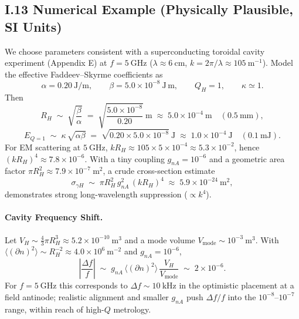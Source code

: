 \subsection*{I.13 Numerical Example (Physically Plausible, SI Units)}
We choose parameters consistent with a superconducting toroidal cavity experiment (Appendix E) at $f\!=\!5~\mathrm{GHz}$ ($\lambda\!\approx\!6~\mathrm{cm}$, $k\!=\!2\pi/\lambda\!\approx\!105~\mathrm{m^{-1}}$). 
Model the effective Faddeev--Skyrme coefficients as
\begin{equation}
\alpha = 0.20~\mathrm{J/m},\qquad \beta = 5.0\times 10^{-8}~\mathrm{J\,m},\qquad Q_H=1,\qquad \kappa\simeq 1.
\end{equation}
Then
\begin{equation}
R_H \;\sim\; \sqrt{\frac{\beta}{\alpha}} \;=\; \sqrt{\frac{5.0\times 10^{-8}}{0.20}}~\mathrm{m} \;\approx\; 5.0\times 10^{-4}~\mathrm{m}\quad (0.5~\mathrm{mm}),
\end{equation}
\begin{equation}
E_{Q=1} \;\sim\; \kappa\,\sqrt{\alpha\beta} \;=\; \sqrt{0.20\times 5.0\times 10^{-8}}~\mathrm{J} \;\approx\; 1.0\times 10^{-4}~\mathrm{J}\quad (0.1~\mathrm{mJ}).
\end{equation}
For EM scattering at $5~\mathrm{GHz}$, $kR_H \approx 105 \times 5\times 10^{-4} \approx 5.3\times 10^{-2}$, hence $(kR_H)^4 \approx 7.8\times 10^{-6}$. 
With a tiny coupling $g_{nA}=10^{-6}$ and a geometric area factor $\pi R_H^2 \approx 7.9\times 10^{-7}~\mathrm{m^2}$, a crude cross-section estimate
\begin{equation}
\sigma_{\gamma H} \;\sim\; \pi R_H^2 \, g_{nA}^2 \, (kR_H)^4 \;\approx\; 5.9\times 10^{-24}~\mathrm{m^2},
\end{equation}
demonstrates strong long-wavelength suppression ($\propto k^4$).

\paragraph{Cavity Frequency Shift.}
Let $V_H \sim \tfrac{4}{3}\pi R_H^3 \approx 5.2\times 10^{-10}~\mathrm{m^3}$ and a mode volume $V_{\mathrm{mode}}\sim 10^{-3}~\mathrm{m^3}$.
With $\langle (\partial n)^2\rangle \sim R_H^{-2} \approx 4.0\times 10^6~\mathrm{m^{-2}}$ and $g_{nA}=10^{-6}$,
\begin{equation}
\left|\frac{\Delta f}{f}\right| \;\sim\; g_{nA}\,\langle (\partial n)^2\rangle\,\frac{V_H}{V_{\mathrm{mode}}} \;\sim\; 2\times 10^{-6}.
\end{equation}
For $f=5~\mathrm{GHz}$ this corresponds to $\Delta f \sim 10~\mathrm{kHz}$ in the optimistic placement at a field antinode; realistic alignment and smaller $g_{nA}$ push $\Delta f/f$ into the $10^{-8}$--$10^{-7}$ range, within reach of high-$Q$ metrology.


